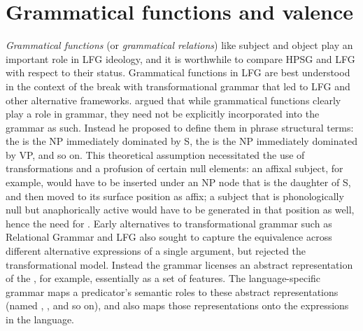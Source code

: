 \section{Grammatical functions and valence} 
\label{valence-sec}
\emph{Grammatical functions}  (or \emph{grammatical relations})  like subject and object play an important role in LFG ideology,  and it is worthwhile to compare HPSG and LFG with respect to their status.  Grammatical functions in LFG are best understood in the context of the break with transformational grammar that led to LFG and other alternative frameworks.  \citet{Chomsky65a} argued that while grammatical functions clearly play a role in  grammar, they need not be explicitly incorporated into the grammar as such.  Instead he proposed to define them in phrase structural terms: the  is the NP immediately dominated by S, the  is the NP immediately dominated by VP, and so on.   This theoretical
assumption necessitated the use of transformations and a
profusion of certain null elements: an affixal subject, for example,
would have to be inserted under an NP node that is the daughter of S, and then moved to its surface position as affix; a subject that is phonologically null but anaphorically active would have to be generated in that position as well, hence the need for .  Early alternatives to transformational grammar such as Relational Grammar \citep{Perlmutter83a-ed} and LFG also sought to  capture the equivalence
across different alternative expressions of a single argument, but
rejected the transformational model.   Instead the grammar licenses an abstract representation of the , for example, essentially as a set of features.  The language-specific grammar maps a predicator's semantic roles to these abstract representations (named , , and so on), and also maps those representations onto the expressions in the language.  

